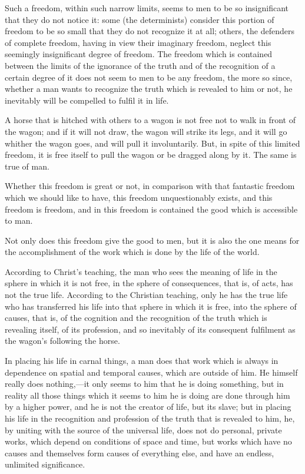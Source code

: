 \documentclass{book}
\begin{document}
Such a freedom, within such narrow limits, seems to men to be so insignificant that they do not notice it: some (the determinists) consider this portion of freedom to be so small that they do not recognize it at all; others, the defenders of complete freedom, having in view their imaginary freedom, neglect this seemingly insignificant degree of freedom. The freedom which is contained between the limits of the ignorance of the truth and of the recognition of a certain degree of it does not seem to men to be any freedom, the more so since, whether a man wants to recognize the truth which is revealed to him or not, he inevitably will be compelled to fulfil it in life.

A horse that is hitched with others to a wagon is not free not to walk in front of the wagon; and if it will not draw, the wagon will strike its legs, and it will go whither the wagon goes, and will pull it involuntarily. But, in spite of this limited freedom, it is free itself to pull the wagon or be dragged along by it. The same is true of man.

Whether this freedom is great or not, in comparison with that fantastic freedom which we should like to have, this freedom unquestionably exists, and this freedom is freedom, and in this freedom is contained the good which is accessible to man.

Not only does this freedom give the good to men, but it is also the one means for the accomplishment of the work which is done by the life of the world.

According to Christ’s teaching, the man who sees the meaning of life in the sphere in which it is not free, in the sphere of consequences, that is, of acts, has not the true life. According to the Christian teaching, only he has the true life who has transferred his life into that sphere in which it is free, into the sphere of causes, that is, of the cognition and the recognition of the truth which is revealing itself, of its profession, and so inevitably of its consequent fulfilment as the wagon’s following the horse.

In placing his life in carnal things, a man does that work which is always in dependence on spatial and temporal causes, which are outside of him. He himself really does nothing,—it only seems to him that he is doing something, but in reality all those things which it seems to him he is doing are done through him by a higher power, and he is not the creator of life, but its slave; but in placing his life in the recognition and profession of the truth that is revealed to him, he, by uniting with the source of the universal life, does not do personal, private works, which depend on conditions of space and time, but works which have no causes and themselves form causes of everything else, and have an endless, unlimited significance.
\end{document}
